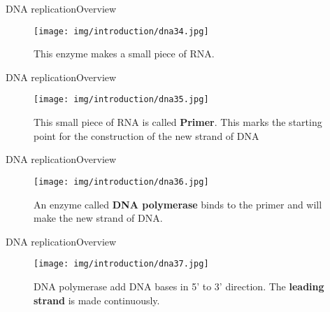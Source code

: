 \documentclass[10pt]{beamer}
\newcommand{\1}{
	\setbeamertemplate{background}{
		\texttt{[image: img/1]}
		\tikz[overlay] \fill[fill opacity=0.75,fill=white] (0,0) rectangle (-\paperwidth,\paperheight);
	}
}
\begin{document}
\begin{frame}{DNA replication}{Overview}
	\begin{figure}[]
		\centering
		\texttt{[image: img/introduction/dna34.jpg]}
		\label{img:mot2}
		\caption{This enzyme makes a small piece of RNA.}
	\end{figure}
\end{frame}

\begin{frame}{DNA replication}{Overview}
	\begin{figure}[]
		\centering
		\texttt{[image: img/introduction/dna35.jpg]}
		\label{img:mot2}
		\caption{This small piece of RNA is called \textbf{Primer}. This marks the starting point for the construction of the new strand of DNA}
	\end{figure}
\end{frame}

\begin{frame}{DNA replication}{Overview}
	\begin{figure}[]
		\centering
		\texttt{[image: img/introduction/dna36.jpg]}
		\label{img:mot2}
		\caption{An enzyme called \textbf{DNA polymerase} binds to the primer and will make the new strand of DNA.}
	\end{figure}
\end{frame}



\begin{frame}{DNA replication}{Overview}
	\begin{figure}[]
		\centering
		\texttt{[image: img/introduction/dna37.jpg]}
		\label{img:mot2}
		\caption{DNA polymerase add DNA bases in 5' to 3' direction. The \textbf{leading strand} is made continuously.}
	\end{figure}
\end{frame}
\end{document}
